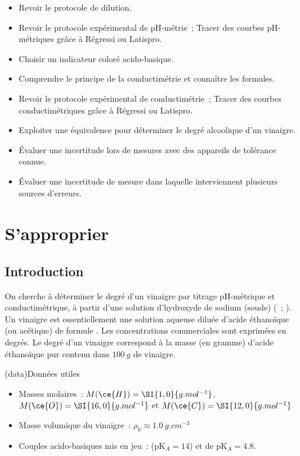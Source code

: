 \documentclass[../main/main.tex]{subfiles}
\begin{document}
{	\begin{itemize}
		\item Revoir le protocole de dilution.
		\item Revoir le protocole expérimental de pH-métrie~; Tracer des courbes
		      pH-métriques grâce à Régressi ou Latispro.
		\item Choisir un indicateur coloré acido-basique.
		\item Comprendre le principe de la conductimétrie et connaître les formules.
		\item Revoir le protocole expérimental de conductimétrie~; Tracer des
		      courbes conductimétriques grâce à Régressi ou Latispro.
		\item Exploiter une équivalence pour déterminer le degré alcoolique d'un
		      vinaigre.
		\item Évaluer une incertitude lors de mesures avec des appareils de
		      tolérance connue.
		\item Évaluer une incertitude de mesure dans laquelle interviennent
		      plusieurs sources d'erreurs.
	\end{itemize}

	\section{S'approprier}
	\subsection{Introduction}

	On cherche à déterminer le degré d'un vinaigre par titrage pH-métrique et
	conductimétrique, à partir d'une solution d'hydroxyde de sodium (soude)
	(~; ). Un vinaigre est essentiellement une solution aqueuse
	diluée d'acide éthanoïque (ou acétique) de formule . Les
	concentrations commerciales sont exprimées en degrés. Le degré d'un vinaigre
	correspond à la masse (en gramme) d'acide éthanoïque pur contenu dans
	$\SI{100}{g}$ de vinaigre.

	\begin{tcb}(data){Données utiles}
		\begin{itemize}
			\item Masses molaires~: $M(\ce{H}) = \SI{1,0}{g.mol^{-1}}$, $M(\ce{O}) =
				      \SI{16,0}{g.mol^{-1}}$ et $M(\ce{C}) = \SI{12,0}{g.mol^{-1}}$
			\item Masse volumique du vinaigre~: $\rho_V \approx \SI{1,0}{g.cm^{-3}}$
			\item Couples acido-basiques mis en jeu~:  (pK$_A = 14$) et
			       de pK$_A = \num{4,8}$.
		\end{itemize}
	\end{tcb}

}
\end{document}
